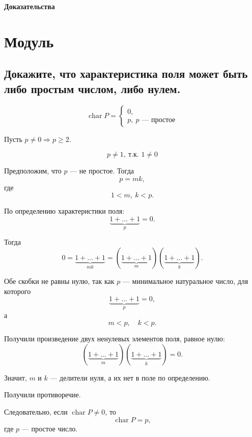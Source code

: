 \begin{center}
    {\Huge \textbf{Доказательства}}
\end{center}

\section{Модуль}

\subsection{Докажите, что характеристика поля может быть либо простым числом, либо нулем.}

\begin{theorem}
    \[
        \operatorname{char} P =
        \begin{cases}
            0, \\
            p,\ p \text{ --- простое}
        \end{cases}
    \]
\end{theorem}

\begin{Proof}
    Пусть $p \neq 0 \Rightarrow p \geq 2$.
    
    \[
        p \neq 1,\ \text{т.к. } 1 \neq 0
    \]
    
    Предположим, что $p$ --- не простое. Тогда
    \[
        p = mk,
    \]
    где
    \[
        1 < m,\ k < p.
    \]
    
    По определению характеристики поля:
    \[
        \underbrace{1 + \ldots + 1}_{p} = 0.
    \]
    
    Тогда
    \[
        0
        =
        \underbrace{1 + \ldots + 1}_{mk}
        =
        (\underbrace{1 + \ldots + 1}_{m})
        (\underbrace{1 + \ldots + 1}_{k}).
    \]
    
    Обе скобки не равны нулю, так как $p$ --- минимальное натуральное число, для которого
    \[
        \underbrace{1 + \ldots + 1}_{p} = 0,
    \]
    а
    \[
        m < p,\quad k < p.
    \]
    
    Получили произведение двух ненулевых элементов поля, равное нулю:
    \[
        (\underbrace{1 + \ldots + 1}_{m})
        (\underbrace{1 + \ldots + 1}_{k}) = 0.
    \]
    
    Значит, $m$ и $k$ --- делители нуля, а их нет в поле по определению.
    
    Получили противоречие.
    
    Следовательно, если $\operatorname{char} P \neq 0$, то
    \[
        \operatorname{char} P = p,
    \]
    где $p$ --- простое число.
\end{Proof}

